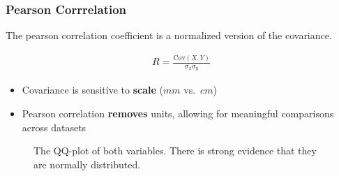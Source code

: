 \documentclass[
  a4paper,
]{scrbook}
\providecommand{\tightlist}{%
  \setlength{\itemsep}{0pt}\setlength{\parskip}{0pt}}\usepackage{longtable,booktabs,array}
\begin{document}
\subsubsection{Pearson Corrrelation}\label{pearson-corrrelation}

The pearson correlation coefficient is a normalized version of the
covariance.

\begin{align}
R = \frac{\mathrm{Cov}(X,Y)}{\sigma_x \sigma_y}
\end{align}

\begin{itemize}
\tightlist
\item
  Covariance is sensitive to \textbf{scale} (\(mm\) vs.~\(cm\))
\item
  Pearson correlation \textbf{removes} units, allowing for meaningful
  comparisons across datasets
\end{itemize}

\begin{figure}[ht]


\caption{\label{fig-drive-shaft-pearson-qq}The QQ-plot of both
variables. There is strong evidence that they are normally distributed.}

\end{figure}%
\end{document}
